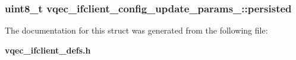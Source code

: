 \subsubsection{\setlength{\rightskip}{0pt plus 5cm}uint8\_\-t \bf{vqec\_\-ifclient\_\-config\_\-update\_\-params\_\-::persisted}}\label{structvqec__ifclient__config__update__params___cfa5a3ed0e397a46b341258076eac762}




The documentation for this struct was generated from the following file:\begin{CompactItemize}
\item 
\bf{vqec\_\-ifclient\_\-defs.h}\end{CompactItemize}
